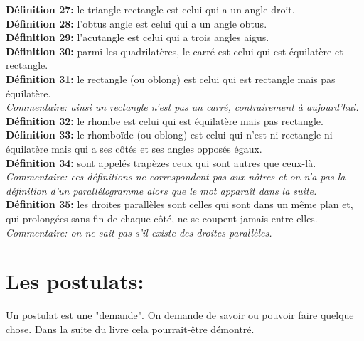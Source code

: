 \documentclass[a4paper, 12pt, twoside]{book}
\begin{document}
\textbf{Définition 27:} le triangle rectangle est celui qui a un angle droit.\\


\textbf{Définition 28:} l'obtus angle est celui qui a un angle obtus.\\

\textbf{Définition 29:} l'acutangle est celui qui a trois angles aigus.\\

\textbf{Définition 30:} parmi les quadrilatères, le carré est celui qui est équilatère et rectangle.\\

\textbf{Définition 31:} le rectangle (ou oblong) est celui qui est rectangle mais pas équilatère.\\

\textit{Commentaire: ainsi un rectangle n'est pas un carré, contrairement à aujourd'hui.}\\


\textbf{Définition 32:} le rhombe  est celui qui est équilatère mais pas rectangle.\\

\textbf{Définition 33:} le rhomboïde (ou oblong) est celui qui n'est ni rectangle ni équilatère mais qui a ses côtés et ses angles opposés égaux.\\


\textbf{Définition 34:} sont appelés trapèzes ceux qui sont autres que ceux-là.\\


\textit{Commentaire: ces définitions ne correspondent pas aux nôtres et on n'a pas la définition d'un parallélogramme alors que le mot apparaît dans la suite.    
}\\

\textbf{Définition 35:} les droites parallèles sont celles qui sont dans un même plan et, qui prolongées sans fin de chaque côté, ne se coupent jamais entre elles.\\


\textit{Commentaire: on ne sait pas s'il existe des droites parallèles.    
}\\

\section{Les postulats:}

Un postulat est une "demande". On demande de savoir ou pouvoir faire quelque chose. Dans la suite du livre cela pourrait-être démontré. \\
\end{document}
